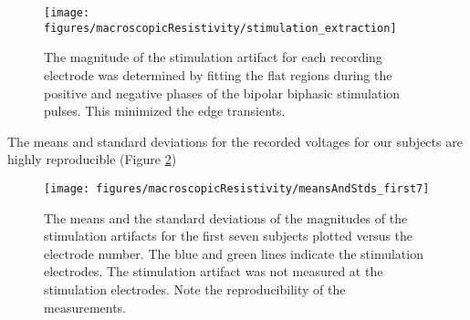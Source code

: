 \begin{figure}[ht]
	\centering
	\texttt{[image: figures/macroscopicResistivity/stimulation\_extraction]}
	\caption[Data extraction]{The magnitude of the stimulation artifact for each recording electrode was determined by fitting the flat regions during the positive and negative phases of the bipolar biphasic stimulation pulses. This minimized the edge transients.}
	\label{fig:mrStimExtraction}
\end{figure}

The means and standard deviations for the recorded voltages for our subjects are highly reproducible (Figure \ref{fig:mrMeansStandards})

\begin{figure}[ht]
	\centering
	\texttt{[image: figures/macroscopicResistivity/meansAndStds\_first7]}
	\caption[Data quality]{The means and the standard deviations of the magnitudes of the stimulation artifacts for the first seven subjects plotted versus the electrode number. The blue and green lines indicate the stimulation electrodes. The stimulation artifact was not measured at the stimulation electrodes. Note the reproducibility of the measurements.}
	\label{fig:mrMeansStandards}
\end{figure}

%
%
%
%
%
%

